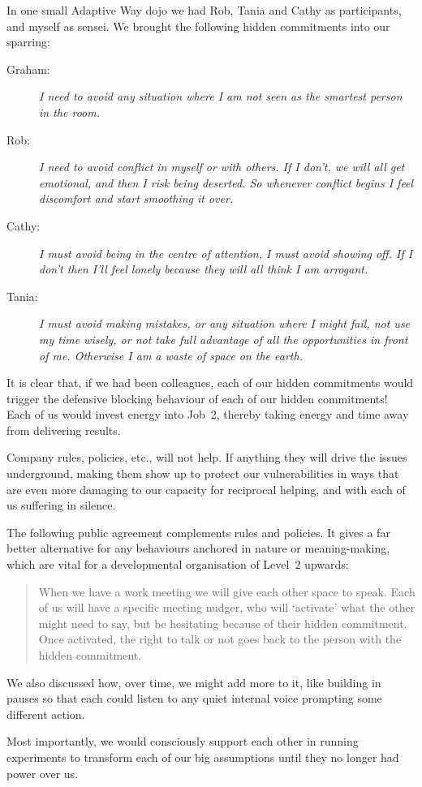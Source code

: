 \begin{longstoryblock}
In one small Adaptive Way  dojo we had Rob, Tania and Cathy as participants, and myself as sensei. We brought the following hidden commitments into our sparring:


\begin{description}
\item[Graham: ]\emph{ I need to avoid any situation where I am not seen as the smartest person in the room.}
\item[Rob: ]\emph{ I need to avoid conflict in myself or with others. If I don't, we will all get emotional, and then I risk being deserted. So whenever conflict begins I feel discomfort and start smoothing it over.}
\item[Cathy: ]\emph{I must avoid being in the centre of attention, I must avoid showing off. If I don't then I'll feel lonely because they will all think I am arrogant.}
\item[Tania: ]\emph{ I must avoid making mistakes, or any situation where I might fail, not use my time wisely, or not take full advantage of all the opportunities in front of me. Otherwise I am a waste of space on the earth. }
\end{description}


It is clear that, if we had been colleagues, each of our hidden commitments would trigger the defensive blocking behaviour of each of our hidden commitments! Each of us would invest energy into Job~2, thereby taking energy and time away from delivering results.


Company rules, policies, etc., will not help. If anything they will drive the issues underground, making them show up to protect our vulnerabilities in ways that are even more damaging to our capacity for reciprocal helping, and with each of us suffering in silence. 


The following public agreement complements rules and policies. It gives a far better alternative for any behaviours anchored in nature or meaning\hyp{}making, which are vital for a developmental organisation of Level~2 upwards:


\begin{quote} 
When we have a work meeting we will give each other space to speak. Each of us will have a specific meeting nudger, who will ‘activate’ what the other might need to say, but be hesitating because of their hidden commitment. Once activated, the right to talk or not goes back to the person with the hidden commitment. 
\end{quote}


We also discussed how, over time, we might add more to it, like building in pauses so that each could listen to any quiet internal voice prompting some different action.


Most importantly, we would consciously support each other in running experiments to transform each of our big assumptions until they no longer had power over us. 
\end{longstoryblock}


